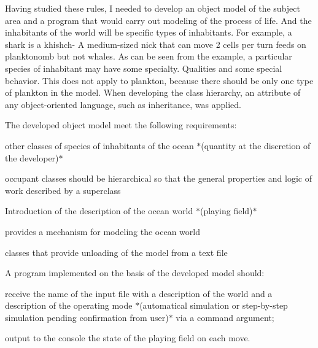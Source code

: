  Having studied these rules, I needed to develop an object model of the subject area and a program that would carry out modeling of the process of life. And the inhabitants of the world will be specific types of inhabitants. For example, a shark is a khishch-\/ A medium-\/sized nick that can move 2 cells per turn feeds on planktonomb but not whales. As can be seen from the example, a particular species of inhabitant may have some specialty. Qualities and some special behavior. This does not apply to plankton, because there should be only one type of plankton in the model. When developing the class hierarchy, an attribute of any object-\/oriented language, such as inheritance, was applied.

 The developed object model meet the following requirements\+:
\begin{DoxyItemize}
\item other classes of species of inhabitants of the ocean $\ast$(quantity at the discretion of the developer)$\ast$
\item occupant classes should be hierarchical so that the general properties and logic of work described by a superclass
\item Introduction of the description of the ocean world $\ast$(playing field)$\ast$
\item provides a mechanism for modeling the ocean world
\item classes that provide unloading of the model from a text file
\end{DoxyItemize}

 A program implemented on the basis of the developed model should\+:
\begin{DoxyItemize}
\item receive the name of the input file with a description of the world and a description of the operating mode $\ast$(automatical simulation or step-\/by-\/step simulation pending confirmation from user)$\ast$ via a command argument;
\item output to the console the state of the playing field on each move. 
\end{DoxyItemize}